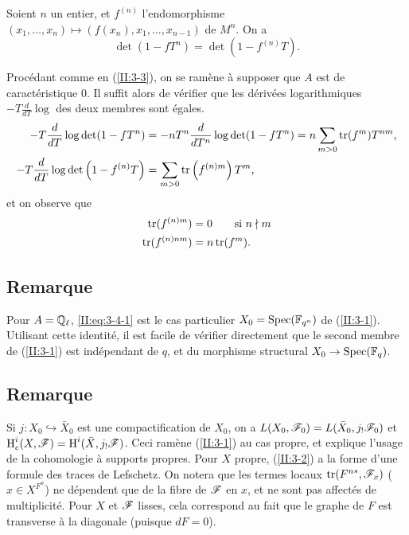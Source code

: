 \begin{corollary_}\label{II:3-4}
Soient $n$ un entier, et $f^{(n)}$ l'endomorphisme 
$(x_1,\dotsc,x_n)\mapsto \left(f(x_n),x_1,\dotsc,x_{n-1}\right)$ de $M^n$. 
On a 
\begin{equation}\label{II:eq:3-4-1}
  \det(1-f T^n) = \det(1-f^{(n)} T) \text{.}
\end{equation}
\end{corollary_}

Procédant comme en (\ref{II:3-3}), on se ramène à supposer que $A$ est de 
caractéristique $0$. Il suffit alors de vérifier que les dérivées 
logarithmiques $-T\frac{d}{dT}\log$ des deux membres sont égales. 
\begin{align*}
  -T\frac{d}{dT}\log\det(1-f T^n) &= - n T^n \frac{d}{dT^n} \log\det(1-f T^n) = n \sum_{m>0} \operatorname{tr}(f^m) T^{n m} \text{,} \\
  -T \frac{d}{dT}\log\det\left(1-f^{(n)} T\right) &= \sum_{m>0} \operatorname{tr}\left(f^{(n) m}\right) T^m \text{,}
\end{align*}
et on observe que 
\begin{align*}
  \operatorname{tr}(f^{(n) m}) &= 0 \qquad \text{si $n\nmid m$} \\
  \operatorname{tr}(f^{(n) n m}) &= n \operatorname{tr}(f^m) \text{.}
\end{align*}





\subsection{Remarque}\label{II:3-5}

Pour $A=\mathbb{Q}_\ell$, \eqref{II:eq:3-4-1} est le cas particulier 
$X_0=\operatorname{Spec}(\mathbb{F}_{q^n})$ de (\ref{II:3-1}). Utilisant cette identité, il est 
facile de vérifier directement que le second membre de (\ref{II:3-1}) est 
indépendant de $q$, et du morphisme structural $X_0\to\operatorname{Spec}(\mathbb{F}_q)$. 





\subsection{Remarque}\label{II:3-6}

Si $j:X_0\hookrightarrow \bar X_0$ est une compactification de $X_0$, on a 
$L(X_0,\mathscr{F}_0) = L(\bar X_0, j_!\mathscr{F}_0)$ et 
$\operatorname{H}_c^i(X,\mathscr{F}) = \operatorname{H}^i(\bar X,j_!\mathscr{F})$. Ceci ramène (\ref{II:3-1}) au cas 
propre, et explique l'usage de la cohomologie à supports propres. Pour $X$ 
propre, (\ref{II:3-2}) a la forme d'une formule des traces de Lefschetz. On 
notera que les termes locaux $\operatorname{tr}(F^{n *},\mathscr{F}_x)$ ($x\in X^{F^n}$) ne 
dépendent que de la fibre de $\mathscr{F}$ en $x$, et ne sont pas affectés de 
multiplicité. Pour $X$ et $\mathscr{F}$ lisses, cela correspond au fait que le graphe 
de $F$ est transverse à la diagonale (puisque $d F = 0$). 





